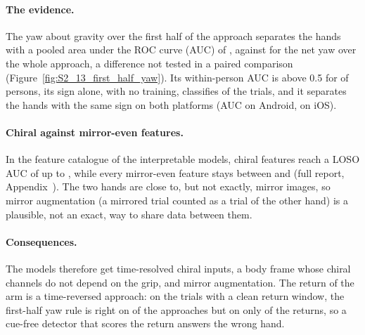 \paragraph{The evidence.} The yaw about gravity over the first half of the approach separates the hands with a
pooled area under the ROC curve (AUC) of , against  for
the net yaw over the whole approach, a difference not tested in a paired comparison
(Figure~\ref{fig:S2_13_first_half_yaw}). Its within-person AUC is above 0.5 for
 of  persons, its sign alone, with no training,
classifies  of the trials, and it separates the hands with the same sign on both
platforms (AUC  on Android,  on iOS).

\paragraph{Chiral against mirror-even features.} In the feature catalogue of the interpretable models, chiral
features reach a LOSO AUC of up to , while every mirror-even feature stays between
 and  (full report, Appendix~). The two
hands are close to, but not exactly, mirror images, so mirror augmentation (a mirrored trial counted as a trial of
the other hand) is a plausible, not an exact, way to share data between them.

\paragraph{Consequences.} The models therefore get time-resolved chiral inputs, a body frame whose chiral channels
do not depend on the grip, and mirror augmentation.
The return of the arm is a time-reversed approach: on the  trials with a clean return
window, the first-half yaw rule is right on  of the approaches but on only
 of the returns, so a cue-free detector that scores the return answers the wrong
hand.
